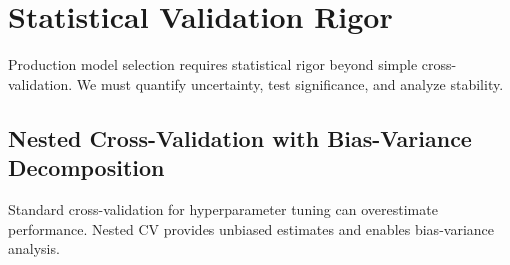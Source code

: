 \section{Statistical Validation Rigor}

Production model selection requires statistical rigor beyond simple cross-validation. We must quantify uncertainty, test significance, and analyze stability.

\subsection{Nested Cross-Validation with Bias-Variance Decomposition}

Standard cross-validation for hyperparameter tuning can overestimate performance. Nested CV provides unbiased estimates and enables bias-variance analysis.

